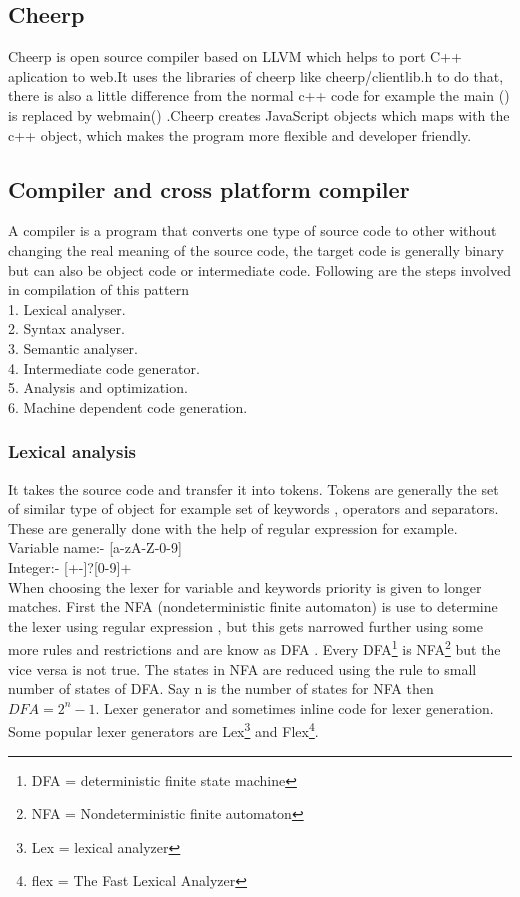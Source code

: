 \documentclass[23pt]{article}
\begin{document}
\subsection{Cheerp}
{\Large  Cheerp is open source compiler based on LLVM which helps to port C++ aplication to web.It uses the libraries of cheerp like cheerp/clientlib.h to do that, there is also a little difference from the normal c++ code for example the main () is replaced by webmain() .Cheerp creates JavaScript objects which maps with the c++ object, which makes the program more flexible and developer friendly. \cite{cheerpback} \par}

\subsection{Compiler and cross platform compiler}

{\Large A compiler is a program that converts one type of source code to other without changing the real meaning of the source code, the target code is generally binary but can also be object code or intermediate code.
Following are the steps involved in compilation of this pattern  \\
1.	Lexical analyser. \\
2.	Syntax analyser. \\
3.	Semantic analyser. \\
4.	Intermediate code generator. \\
5.	Analysis and optimization. \\
6.	Machine dependent code generation. \\
\par}

\subsubsection{Lexical analysis}
{\Large It takes the source code and transfer it into tokens. Tokens are generally the set of similar type of object for example set of keywords , operators and separators. These are generally done with the help of regular expression for example.
Variable name:- [a-zA-Z-0-9] \\
Integer:- [+-]?[0-9]+ \\
When choosing the lexer for variable and keywords priority is given to longer matches. First the NFA (nondeterministic finite automaton) is use to determine the lexer using regular expression
, but this gets narrowed further using some more rules and restrictions and are know
as DFA . Every DFA\footnote{ DFA =  deterministic finite state machine } is NFA\footnote{ NFA = Nondeterministic finite automaton} but the vice versa is not true. The states in NFA are reduced using the rule to small number of states of DFA. Say n is the number of states for NFA then  $ DFA=2^n-1 $.
Lexer generator and sometimes inline code for lexer generation. Some popular lexer generators are Lex\footnote{ Lex = lexical analyzer} and Flex\footnote{flex = The Fast Lexical Analyzer}. \par}
\end{document}
